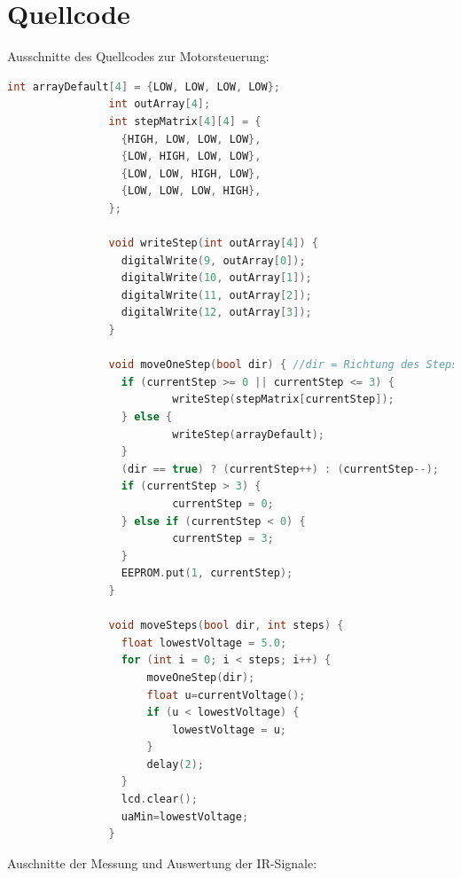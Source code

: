 \documentclass[11pt, titlepage]{report}
\begin{document}
		\newpage
		\addtocounter{section}{1}
		\label{sec:TechDraws}
			
			
			
			
		\section{Quellcode}
		\label{sec:Code}
			Ausschnitte des Quellcodes zur Motorsteuerung:
			\begin{lstlisting}[gobble=28, frame=single, language=C++]
				int arrayDefault[4] = {LOW, LOW, LOW, LOW};
				int outArray[4];
				int stepMatrix[4][4] = {
  				  {HIGH, LOW, LOW, LOW},
  				  {LOW, HIGH, LOW, LOW},
  				  {LOW, LOW, HIGH, LOW},
  				  {LOW, LOW, LOW, HIGH},
				};

				void writeStep(int outArray[4]) {
				  digitalWrite(9, outArray[0]);
				  digitalWrite(10, outArray[1]);
				  digitalWrite(11, outArray[2]);
				  digitalWrite(12, outArray[3]);
				}

				void moveOneStep(bool dir) { //dir = Richtung des Steps
  				  if (currentStep >= 0 || currentStep <= 3) {
    			    	  writeStep(stepMatrix[currentStep]);
  				  } else {
    			    	  writeStep(arrayDefault);
  				  }
  				  (dir == true) ? (currentStep++) : (currentStep--);
  				  if (currentStep > 3) {
    			    	  currentStep = 0;
  				  } else if (currentStep < 0) {
    			    	  currentStep = 3;
  				  }
  				  EEPROM.put(1, currentStep);
				}

				void moveSteps(bool dir, int steps) {
  				  float lowestVoltage = 5.0;
  				  for (int i = 0; i < steps; i++) {
    				  moveOneStep(dir);
    				  float u=currentVoltage();
    				  if (u < lowestVoltage) {
      					  lowestVoltage = u;
    				  }
    				  delay(2);
  				  }
  				  lcd.clear();
  				  uaMin=lowestVoltage;
				}
			\end{lstlisting}
			\newpage
			Auschnitte der Messung und Auswertung der IR-Signale:
\end{document}
